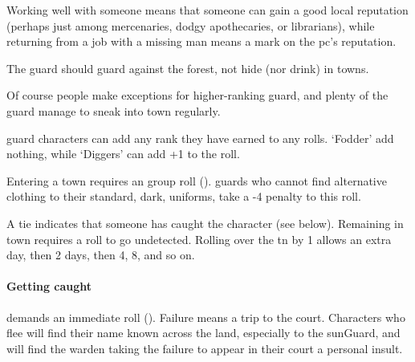 \begin{multicols}{2}
Working well with someone means that someone can gain a good local reputation (perhaps just among mercenaries, dodgy apothecaries, or librarians), while returning from a job with a missing man means a mark on the \gls{pc}'s reputation.

The \gls{guard} should guard against the forest, not hide (nor drink) in towns.


Of course people make exceptions for higher-ranking \gls{guard}, and plenty of the guard manage to sneak into town regularly.

\Gls{guard} characters can add any rank they have earned to any rolls.
`Fodder' add nothing, while `Diggers' can add +1 to the roll.

Entering a town requires an  group roll (\tn[7]).
\Glspl{guard} who cannot find alternative clothing to their standard, dark, uniforms, take a -4 penalty to this roll.

A tie indicates that someone has caught the character (see below).
Remaining in town requires a  roll to go undetected.
Rolling over the \gls{tn} by 1 allows an extra day, then 2 days, then 4, 8, and so on.

\paragraph{Getting caught}
demands an immediate  roll (\tn[10]).
Failure means a trip to the \gls{court}.
Characters who flee will find their name known across the land, especially to the \gls{sunGuard}, and will find the \gls{warden} taking the failure to appear in their \gls{court} a personal insult.


\end{multicols}

